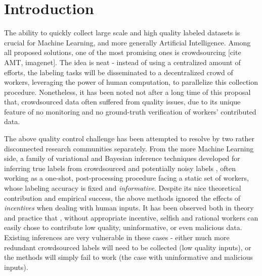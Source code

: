 \section{Introduction}
The ability to quickly collect large scale and high quality labeled datasets is crucial for Machine Learning, and more generally Artificial Intelligence. Among all proposed solutions, one of the most promising ones is crowdsourcing \cite{} [cite AMT, imagenet]. The idea is neat - instead of using a centralized amount of efforts, the labeling tasks will be disseminated to a decentralized crowd of workers, leveraging the power of human computation, to parallelize this collection procedure. Nonetheless, it has been noted not after a long time of this proposal that, crowdsourced data often suffered from quality issues, due to its unique feature of no monitoring and no ground-truth verification of workers' contributed data. 

The above quality control challenge has been attempted to resolve by two rather disconnected research communities separately. From the more Machine Learning side, a family of variational and Bayesian inference techniques developed for inferring true labels from crowdsourced and potentially noisy labels \cite{}, often working as a one-shot, post-processing procedure facing a static set of workers, whose labeling accuracy is fixed and \emph{informative}. Despite its nice theoretical contribution and empirical success, the above methods ignored the effects of \emph{incentives} when dealing with human inputs. It has been observed both in theory and practice that \cite{}, without appropriate incentive, selfish and rational workers can easily chose to contribute low quality, uninformative, or even malicious data. Existing inferences are very vulnerable in these cases - either much more redundant crowdsourced labels will need to be collected (low quality inputs), or the methods will simply fail to work (the case with uninformative and malicious inputs). 

